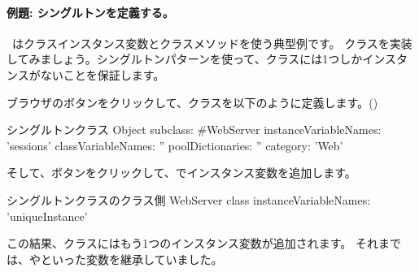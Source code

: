 \documentclass[a4paper,10pt,twoside]{book}
\begin{document}
\paragraph{例題: シングルトンを定義する。}
~\cite{Alpe98a}はクラスインスタンス変数とクラスメソッドを使う典型例です。
クラスを実装してみましょう。シングルトンパターンを使って、クラスには1つしかインスタンスがないことを保証します。

ブラウザのボタンをクリックして、クラスを以下のように定義します。()

\begin{classdef}[singleton]{シングルトンクラス}
Object subclass: #WebServer
	instanceVariableNames: 'sessions' 	
	classVariableNames: '' 	
	poolDictionaries: '' 	
	category: 'Web'
\end{classdef}

そして、ボタンをクリックして、でインスタンス変数を追加します。

\begin{classdef}[webserver]{シングルトンクラスのクラス側}
WebServer class 	
	instanceVariableNames: 'uniqueInstance'
\end{classdef}

この結果、クラスにはもう1つのインスタンス変数が追加されます。
それまでは、やといった変数を継承していました。
\end{document}
